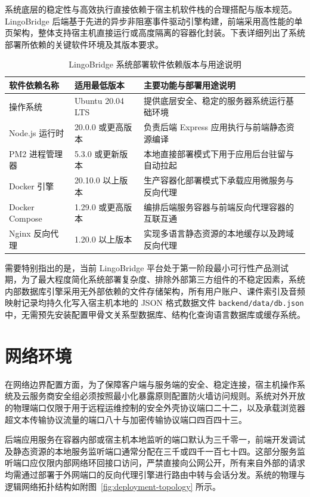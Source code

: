 系统底层的稳定性与高效执行直接依赖于宿主机软件栈的合理搭配与版本规范。LingoBridge 后端基于先进的异步非阻塞事件驱动引擎构建，前端采用高性能的单页架构，整体支持宿主机直接运行或高度隔离的容器化封装。下表详细列出了系统部署所依赖的关键软件环境及其版本要求。

\begin{table}[htbp]
  \centering
  \caption{LingoBridge 系统部署软件依赖版本与用途说明}
  \label{tab:software-requirements}
  \begin{tabularx}{\textwidth}{llX}
    \toprule
    软件依赖名称 & 适用最低版本 & 主要功能与部署用途说明 \\
    \midrule
    操作系统 & Ubuntu 20.04 LTS & 提供底层安全、稳定的服务器系统运行基础环境 \\
    Node.js 运行时 & 20.0.0 或更高版本 & 负责后端 Express 应用执行与前端静态资源编译 \\
    PM2 进程管理器 & 5.3.0 或更新版本 & 本地直接部署模式下用于应用后台驻留与自动拉起 \\
    Docker 引擎 & 20.10.0 以上版本 & 生产容器化部署模式下承载应用微服务与反向代理 \\
    Docker Compose & 1.29.0 或更高版本 & 编排后端服务容器与前端反向代理容器的互联互通 \\
    Nginx 反向代理 & 1.20.0 以上版本 & 实现多语言静态资源的本地缓存以及跨域反向代理 \\
    \bottomrule
  \end{tabularx}
\end{table}

需要特别指出的是，当前 LingoBridge 平台处于第一阶段最小可行性产品测试期，为了最大程度简化系统部署复杂度、排除外部第三方组件的不稳定因素，系统内部数据库引擎采用无外部依赖的文件存储架构，所有用户账户、课件索引及音频映射记录均持久化写入宿主机本地的 JSON 格式数据文件 \texttt{backend/data/db.json} 中，无需预先安装配置甲骨文关系型数据库、结构化查询语言数据库或缓存系统。

\section{网络环境}

在网络边界配置方面，为了保障客户端与服务端的安全、稳定连接，宿主机操作系统及云服务商安全组必须按照最小化暴露原则配置防火墙访问规则。系统对外开放的物理端口仅限于用于远程运维控制的安全外壳协议端口二十二，以及承载浏览器超文本传输协议流量的端口八十与加密传输协议端口四百四十三。

后端应用服务在容器内部或宿主机本地监听的端口默认为三千零一，前端开发调试及静态资源的本地服务监听端口通常分配在三千或四千一百七十四。这部分服务监听端口应仅限内部网络环回接口访问，严禁直接向公网公开，所有来自外部的请求均需通过部署于外网端口的反向代理引擎进行路由中转与会话分发。系统的物理与逻辑网络拓扑结构如附图~\ref{fig:deployment-topology} 所示。

